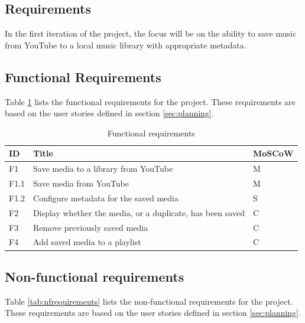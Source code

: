 \subsection{Requirements}
In the first iteration of the project, the focus will be on the ability 
to save music from YouTube to a local music library with appropriate metadata.

\subsection*{Functional Requirements}
Table \ref{tab:frequirements} lists the functional requirements for the project.
These requirements are based on the user stories defined in section \ref{sec:planning}.
\begin{table}[H]
\caption{Functional requirements}
\centering
\begin{tabular}{|l|l|l|}
\hline

\textbf{ID}  & \textbf{Title}                                              & \textbf{MoSCoW} \\ \hline
F1           & Save media to a library from YouTube                        & M               \\ \hline
F1.1         & Save media from YouTube                                     & M               \\ \hline
F1.2         & Configure metadata for the saved media                      & S               \\ \hline
F2           & Display whether the media, or a duplicate, has been saved   & C               \\ \hline
F3           & Remove previously saved media                               & C               \\ \hline
F4           & Add saved media to a playlist                               & C               \\ \hline
\end{tabular}
\label{tab:frequirements}
\end{table}


\subsection*{Non-functional requirements}
Table \ref{tab:nfrequirements} lists the non-functional requirements for the project.
These requirements are based on the user stories defined in section \ref{sec:planning}.

